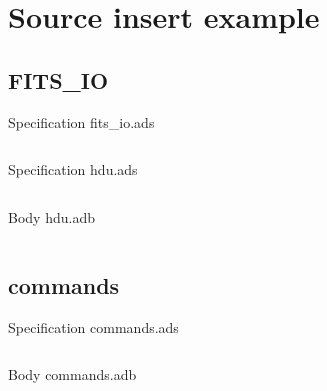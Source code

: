 \documentclass[a4paper,10pt]{article}
\begin{document}
\section{Source insert example}

\subsection{FITS\_IO}

Specification fits\_io.ads
\inputminted{ada}{../fits_io.ads}


Specification hdu.ads
\inputminted{ada}{../hdu.ads}

Body hdu.adb
\inputminted{ada}{../hdu.adb}


\subsection{commands}

Specification commands.ads
\inputminted{ada}{../commands.ads}

Body commands.adb
\inputminted{ada}{../commands.adb}


\end{document}
